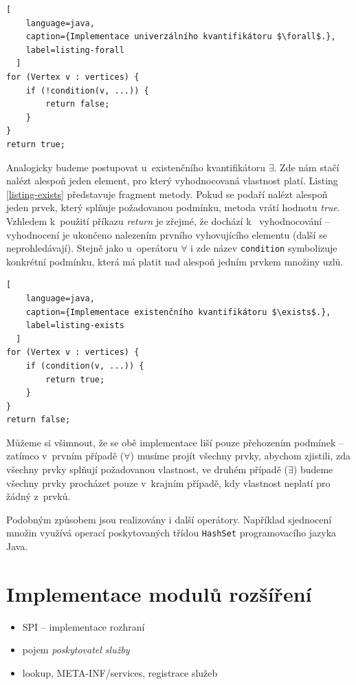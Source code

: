 \begin{lstlisting}[
    language=java,
    caption={Implementace univerzálního kvantifikátoru $\forall$.},
    label=listing-forall
  ]
for (Vertex v : vertices) {
    if (!condition(v, ...)) {
        return false;
    }
}
return true;
\end{lstlisting}

Analogicky budeme postupovat u~existenčního kvantifikátoru $\exists$. Zde nám stačí nalézt alespoň jeden element, pro který vyhodnocovaná vlastnost platí. Listing \ref{listing-exists} představuje fragment metody. Pokud se podaří nalézt alespoň jeden prvek, který splňuje požadovanou podmínku, metoda vrátí hodnotu \emph{true}. Vzhledem k~použití příkazu \emph{return} je zřejmé, že dochází k~ vyhodnocování -- vyhodnocení je ukončeno nalezením prvního vyhovujícího elementu (další se neprohledávají). Stejně jako u~operátoru $\forall$ i zde název \verb+condition+ symbolizuje konkrétní podmínku, která má platit nad alespoň jedním prvkem množiny uzlů.

\begin{lstlisting}[
    language=java,
    caption={Implementace existenčního kvantifikátoru $\exists$.},
    label=listing-exists
  ]
for (Vertex v : vertices) {
    if (condition(v, ...)) {
        return true;
    }
}
return false;
\end{lstlisting}

Můžeme si všimnout, že se obě implementace liší pouze přehozením podmínek -- zatímco v~prvním případě ($\forall$) musíme projít všechny prvky, abychom zjistili, zda všechny prvky splňují požadovanou vlastnost, ve druhém případě ($\exists$) budeme všechny prvky procházet pouze v~krajním případě, kdy vlastnost neplatí pro žádný z~prvků.

Podobným způsobem jsou realizovány i další operátory. Například sjednocení množin využívá operací poskytovaných třídou \verb-HashSet- programovacího jazyka Java.

\section{Implementace modulů rozšíření}

\begin{itemize}
\item SPI -- implementace rozhraní
\item pojem \emph{poskytovatel služby}
\item lookup, META-INF/services, registrace služeb
\end{itemize}

